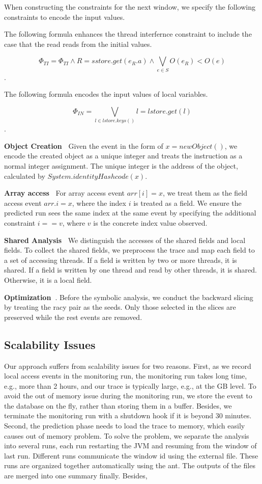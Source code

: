 When constructing the constraints for the next window, we specify the following constraints to encode the input values.

The following formula enhances the thread interfernce constraint to include the case that the read reads from the initial values. 

$$\Phi_{TI}=\Phi_{TI} \wedge  R=sstore.get(e_R.a) \wedge \bigvee_{e\in S} O(e_R)<O(e)$$.

The following formula encodes the input values of local variables. 

$$\Phi_{IN}=\bigvee_{l\in lstore.keys()} l=lstore.get(l)$$.
 

{\bf Object Creation\ } Given the event in the form of $x=new Object()$, we encode the created object as a unique integer and treats the instruction as a normal integer assignment. The unique integer is the address of the object, calculated by $System.identityHashcode(x)$.


{\bf Array access\ } For array access event $arr[i]=x$, we treat them as the field access event $arr.i=x$, where the index $i$ is treated as a field. 
We ensure the predicted run sees the same index at the same event by specifying the additional constraint $i==v$, where $v$ is the concrete index value observed. 

{\bf Shared Analysis\ } We distinguish the accesses of the shared fields and local fields. To collect the shared fields, we preprocess the trace and map each field to a set of accessing threads. If a field is written by two or more threads, it is shared. If a field is written by one thread and read by other threads, it is shared. Otherwise, it is a local field. 

{\bf Optimization\ }. Before the symbolic analysis, we conduct the backward slicing by treating the racy pair as the seeds. Only those selected in the slices are preserved while the rest events are removed. 



\subsection{Scalability Issues}
Our approach suffers from scalability issues for two reasons. First, as we record local access events in the monitoring run,  the monitoring run takes long time, e.g., more than 2 hours, and our trace is typically large, e.g., at the GB level. To avoid the out of memory issue during the monitoring run, we store the event to the database on the fly, rather than storing them in a buffer. Besides, we terminate the monitoring run with a shutdown hook if it is beyond 30 minutes. Second,  the prediction phase needs to load the trace to memory, which easily causes out of memory problem. To solve the problem, we separate the analysis into several runs, each run restarting the JVM and resuming from the window of last run. Different runs communicate the window id using the external file. These runs are organized together automatically using the ant. The outputs of the files are merged into one summary finally. Besides, 